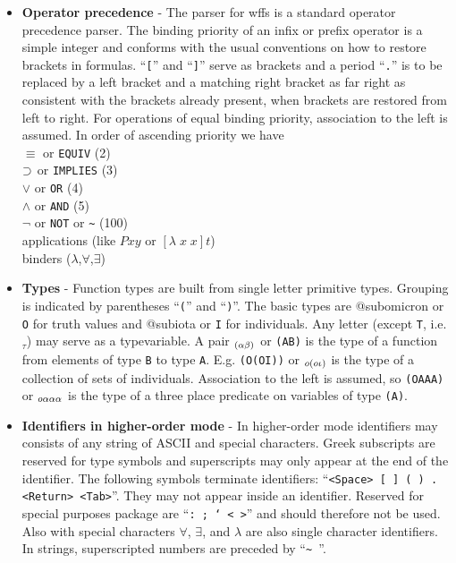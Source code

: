 \begin{itemize} %
\item {\bf Operator precedence} - The parser for wffs is a standard operator
precedence parser.  The binding priority of an infix or prefix operator
is a simple integer and conforms with the usual conventions on how
to restore brackets in formulas.  ``{\tt [}'' and ``{\tt ]}'' serve as 
brackets and a period ``{\tt .}'' is to be  replaced by a left bracket
and a matching right bracket as far right as consistent with the
brackets already present, when brackets are restored from left to right.
For operations of equal binding priority, association to the left is assumed.
In order of ascending priority we have \\
$\equiv$ or {\tt EQUIV} (2) \\
$\mathbin{\supset}$ or {\tt IMPLIES} (3) \\
$\lor$ or {\tt OR} (4) \\
$\land$ or {\tt AND} (5) \\
$\lnot$ or {\tt NOT} or \verb+~+ (100) \\
applications (like $Pxy$ or {\tt $[\lambda \; x \; x]t$}) \\
binders ($\lambda$,$\forall$,$\exists$)

\item {\bf Types} - Function types are built from single letter primitive types.  Grouping
is indicated by parentheses ``{\tt (}'' and ``{\tt )}''.  The basic types
are @subomicron or {\tt O} for truth values and @subiota or {\tt I} for
individuals.  Any letter (except {\tt T}, i.e.  $_\tau$) may serve as a
typevariable.  A pair $_{(\alpha\beta)}$ or {\tt (AB)} is the type of
a function from elements of type {\tt B} to type {\tt A}.
E.g.  {\tt (O(OI))} or $_{o(o\iota)}$ is the type of
a collection of sets of individuals.  Association to the left is
assumed, so {\tt (OAAA)} or $_{o\alpha\alpha\alpha}$
is the type of a
three place predicate on variables of type {\tt (A)}.

\item {\bf Identifiers in higher-order mode} - In higher-order mode identifiers
may consists of any string of ASCII and special characters.  Greek
subscripts are reserved for type symbols and superscripts may only
appear at the end of the identifier.  The following symbols terminate
identifiers:  ``{\tt <Space> [ ] ( ) .  ~ <Return> <Tab>}''.  They may not
appear inside an identifier.  Reserved for special purposes package are
``{\tt :  ; ` < >}'' and should therefore not be used.  Also with special characters
 $\forall$, $\exists$, and $\lambda$ are also single character identifiers.
In strings, superscripted numbers are preceded by ``{\tt \verb+~+ }''.


\end{itemize}
